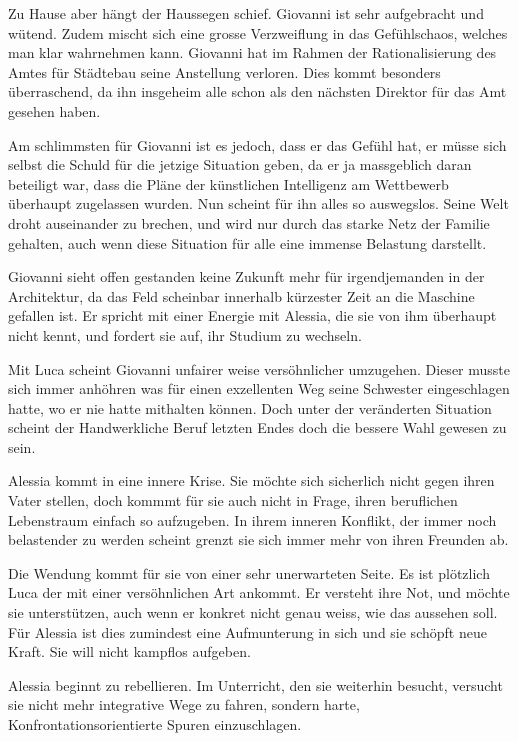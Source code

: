 \documentclass[11pt,a4paper,ngerman]{scrreprt}
\begin{document}
Zu Hause aber hängt der Haussegen schief. Giovanni ist sehr aufgebracht und
wütend. Zudem mischt sich eine grosse Verzweiflung in das Gefühlschaos,
welches man klar wahrnehmen kann. Giovanni hat im Rahmen der Rationalisierung
des Amtes für Städtebau seine Anstellung verloren. Dies kommt besonders
überraschend, da ihn insgeheim alle schon als den nächsten Direktor für das
Amt gesehen haben.

Am schlimmsten für Giovanni ist es jedoch, dass er das Gefühl hat, er müsse
sich selbst die Schuld für die jetzige Situation geben, da er ja massgeblich
daran beteiligt war, dass die Pläne der künstlichen Intelligenz am Wettbewerb
überhaupt zugelassen wurden. Nun scheint für ihn alles so auswegslos. Seine
Welt droht auseinander zu brechen, und wird nur durch das starke Netz der
Familie gehalten, auch wenn diese Situation für alle eine immense Belastung
darstellt.

Giovanni sieht offen gestanden keine Zukunft mehr für irgendjemanden in der
Architektur, da das Feld scheinbar innerhalb kürzester Zeit an die Maschine
gefallen ist. Er spricht mit einer Energie mit Alessia, die sie von ihm
überhaupt nicht kennt, und fordert sie auf, ihr Studium zu wechseln.

Mit Luca scheint Giovanni unfairer weise versöhnlicher umzugehen. Dieser
musste sich immer anhöhren was für einen exzellenten Weg seine Schwester
eingeschlagen hatte, wo er nie hatte mithalten können. Doch unter der
veränderten Situation scheint der Handwerkliche Beruf letzten Endes doch die
bessere Wahl gewesen zu sein.

Alessia kommt in eine innere Krise. Sie möchte sich sicherlich nicht gegen
ihren Vater stellen, doch kommmt für sie auch nicht in Frage, ihren
beruflichen Lebenstraum einfach so aufzugeben. In ihrem inneren Konflikt, der
immer noch belastender zu werden scheint grenzt sie sich immer mehr von ihren
Freunden ab.

Die Wendung kommt für sie von einer sehr unerwarteten Seite. Es ist plötzlich
Luca der mit einer versöhnlichen Art ankommt. Er versteht ihre Not, und
möchte sie unterstützen, auch wenn er konkret nicht genau weiss, wie das
aussehen soll. Für Alessia ist dies zumindest eine Aufmunterung in sich und
sie schöpft neue Kraft. Sie will nicht kampflos aufgeben.

Alessia beginnt zu rebellieren. Im Unterricht, den sie weiterhin besucht,
versucht sie nicht mehr integrative Wege zu fahren, sondern harte,
Konfrontationsorientierte Spuren einzuschlagen.
\end{document}
